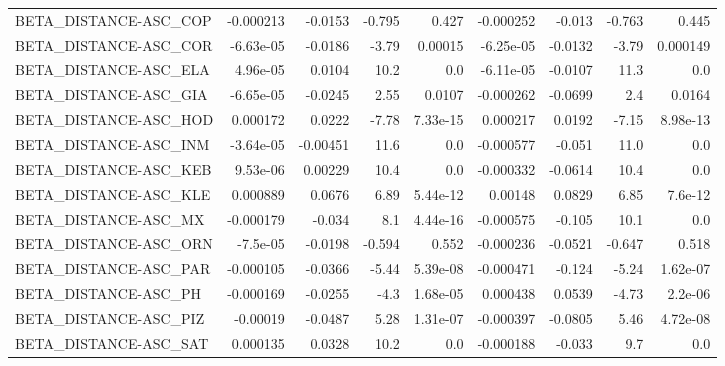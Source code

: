 \begin{tabular}{lrrrrrrrr}
BETA\_DISTANCE-ASC\_COP                   &   -0.000213 &      -0.0153 &  -0.795 &    0.427 &  -0.000252 &      -0.013 &       -0.763 &         0.445 \\
BETA\_DISTANCE-ASC\_COR                   &   -6.63e-05 &      -0.0186 &   -3.79 &  0.00015 &  -6.25e-05 &     -0.0132 &        -3.79 &      0.000149 \\
BETA\_DISTANCE-ASC\_ELA                   &    4.96e-05 &       0.0104 &    10.2 &      0.0 &  -6.11e-05 &     -0.0107 &         11.3 &           0.0 \\
BETA\_DISTANCE-ASC\_GIA                   &   -6.65e-05 &      -0.0245 &    2.55 &   0.0107 &  -0.000262 &     -0.0699 &          2.4 &        0.0164 \\
BETA\_DISTANCE-ASC\_HOD                   &    0.000172 &       0.0222 &   -7.78 & 7.33e-15 &   0.000217 &      0.0192 &        -7.15 &      8.98e-13 \\
BETA\_DISTANCE-ASC\_INM                   &   -3.64e-05 &     -0.00451 &    11.6 &      0.0 &  -0.000577 &      -0.051 &         11.0 &           0.0 \\
BETA\_DISTANCE-ASC\_KEB                   &    9.53e-06 &      0.00229 &    10.4 &      0.0 &  -0.000332 &     -0.0614 &         10.4 &           0.0 \\
BETA\_DISTANCE-ASC\_KLE                   &    0.000889 &       0.0676 &    6.89 & 5.44e-12 &    0.00148 &      0.0829 &         6.85 &       7.6e-12 \\
BETA\_DISTANCE-ASC\_MX                    &   -0.000179 &       -0.034 &     8.1 & 4.44e-16 &  -0.000575 &      -0.105 &         10.1 &           0.0 \\
BETA\_DISTANCE-ASC\_ORN                   &    -7.5e-05 &      -0.0198 &  -0.594 &    0.552 &  -0.000236 &     -0.0521 &       -0.647 &         0.518 \\
BETA\_DISTANCE-ASC\_PAR                   &   -0.000105 &      -0.0366 &   -5.44 & 5.39e-08 &  -0.000471 &      -0.124 &        -5.24 &      1.62e-07 \\
BETA\_DISTANCE-ASC\_PH                    &   -0.000169 &      -0.0255 &    -4.3 & 1.68e-05 &   0.000438 &      0.0539 &        -4.73 &       2.2e-06 \\
BETA\_DISTANCE-ASC\_PIZ                   &    -0.00019 &      -0.0487 &    5.28 & 1.31e-07 &  -0.000397 &     -0.0805 &         5.46 &      4.72e-08 \\
BETA\_DISTANCE-ASC\_SAT                   &    0.000135 &       0.0328 &    10.2 &      0.0 &  -0.000188 &      -0.033 &          9.7 &           0.0 \\

\end{tabular}
